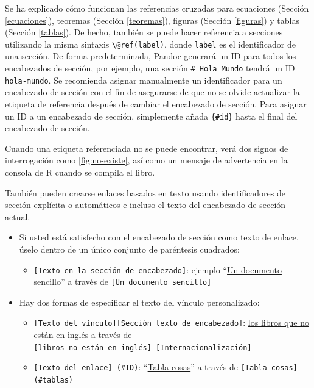\documentclass[12pt,]{krantz}
\providecommand{\tightlist}{%
  \setlength{\itemsep}{0pt}\setlength{\parskip}{0pt}}
\theoremstyle{definition}
\theoremstyle{definition}
\theoremstyle{definition}
\theoremstyle{remark}
\begin{document}
Se ha explicado cómo funcionan las referencias cruzadas para ecuaciones
(Sección \ref{ecuaciones}), teoremas (Sección \ref{teoremas}), figuras
(Sección \ref{figuras}) y tablas (Sección \ref{tablas}). De hecho,
también se puede hacer referencia a secciones utilizando la misma
sintaxis \texttt{\textbackslash{}@ref(label)}, donde \texttt{label} es
el identificador de una sección. De forma predeterminada, Pandoc
generará un ID para todos los encabezados de sección, por ejemplo, una
sección \texttt{\#\ Hola\ Mundo} tendrá un ID \texttt{hola-mundo}. Se
recomienda asignar manualmente un identificador para un encabezado de
sección con el fin de asegurarse de que no se olvide actualizar la
etiqueta de referencia después de cambiar el encabezado de sección. Para
asignar un ID a un encabezado de sección, simplemente añada
\texttt{\{\#id\}} hasta el final del encabezado de sección.

Cuando una etiqueta referenciada no se puede encontrar, verá dos signos
de interrogación como \ref{fig:no-existe}, así como un mensaje de
advertencia en la consola de R cuando se compila el libro.

También pueden crearse enlaces basados en texto usando identificadores
de sección explícita o automáticos e incluso el texto del encabezado de
sección actual.

\begin{itemize}
\tightlist
\item
  Si usted está satisfecho con el encabezado de sección como texto de
  enlace, úselo dentro de un único conjunto de paréntesis cuadrados:

  \begin{itemize}
  \tightlist
  \item
    \texttt{{[}Texto\ en\ la\ sección\ de\ encabezado{]}}: ejemplo
    ``\protect\hyperlink{un-documento-sencillo}{Un documento sencillo}''
    a través de \texttt{{[}Un\ documento\ sencillo{]}}
  \end{itemize}
\item
  Hay dos formas de especificar el texto del vínculo personalizado:

  \begin{itemize}
  \tightlist
  \item
    \texttt{{[}Texto\ del\ vínculo{]}{[}Sección\ texto\ de\ encabezado{]}}:
    \protect\hyperlink{internacionalizacion}{los libros que no están en
    inglés} a través de
    \texttt{{[}libros\ no\ están\ en\ inglés{]}\ {[}Internacionalización{]}}
  \item
    \texttt{{[}Texto\ del\ enlace{]}\ (\#ID)}:
    ``\protect\hyperlink{tablas}{Tabla cosas}'' a través de
    \texttt{{[}Tabla\ cosas{]}(\#tablas)}
  \end{itemize}
\end{itemize}
\end{document}
